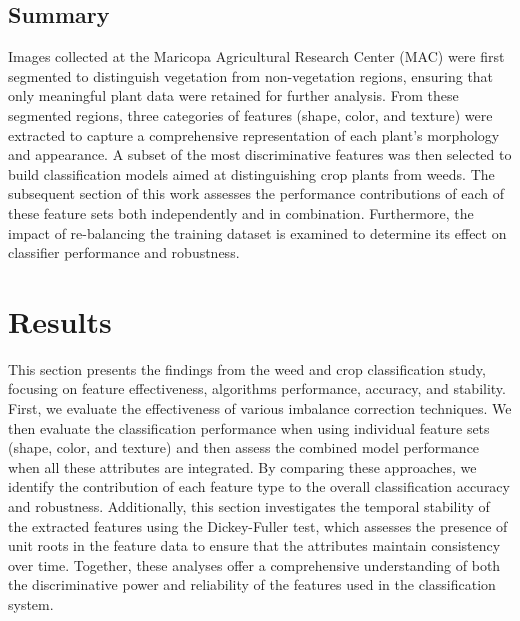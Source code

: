 \documentclass[letterpaper]{report}
\begin{document}
\section{Summary}
Images collected at the Maricopa Agricultural Research Center (MAC) were first segmented to distinguish vegetation from non-vegetation regions, ensuring that only meaningful plant data were retained for further analysis. From these segmented regions, three categories of features (shape, color, and texture) were extracted to capture a comprehensive representation of each plant’s morphology and appearance. A subset of the most discriminative features was then selected to build classification models aimed at distinguishing crop plants from weeds. The subsequent section of this work assesses the performance contributions of each of these feature sets both independently and in combination. Furthermore, the impact of re-balancing the training dataset is examined to determine its effect on classifier performance and robustness.

%
%

\chapter{Results}
\label{section:results}
This section presents the findings from the weed and crop classification study, focusing on feature effectiveness, algorithms performance, accuracy, and stability. First, we evaluate the effectiveness of various imbalance correction techniques.  We then evaluate the classification performance when using individual feature sets (shape, color, and texture) and then assess the combined model performance when all these attributes are integrated. By comparing these approaches, we identify the contribution of each feature type to the overall classification accuracy and robustness. Additionally, this section investigates the temporal stability of the extracted features using the Dickey-Fuller test, which assesses the presence of unit roots in the feature data to ensure that the attributes maintain consistency over time. Together, these analyses offer a comprehensive understanding of both the discriminative power and reliability of the features used in the classification system.
\end{document}
